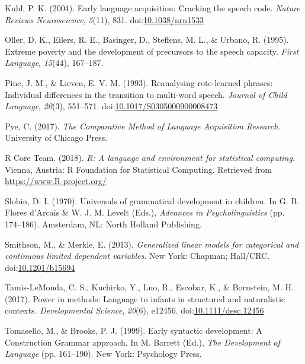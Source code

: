 \documentclass[,man,floatsintext]{apa6}
\begin{document}
\hypertarget{ref-kuhl2004early}{}
Kuhl, P. K. (2004). Early language acquisition: Cracking the speech
code. \emph{Nature Reviews Neuroscience}, \emph{5}(11), 831.
doi:\href{https://doi.org/10.1038/nrn1533}{10.1038/nrn1533}

\hypertarget{ref-oller1995extreme}{}
Oller, D. K., Eilers, R. E., Basinger, D., Steffens, M. L., \& Urbano,
R. (1995). Extreme poverty and the development of precursors to the
speech capacity. \emph{First Language}, \emph{15}(44), 167--187.

\hypertarget{ref-pine1993reanalysing}{}
Pine, J. M., \& Lieven, E. V. M. (1993). Reanalysing rote-learned
phrases: Individual differences in the transition to multi-word speech.
\emph{Journal of Child Language}, \emph{20}(3), 551--571.
doi:\href{https://doi.org/10.1017/S0305000900008473}{10.1017/S0305000900008473}

\hypertarget{ref-pye2017comparative}{}
Pye, C. (2017). \emph{The Comparative Method of Language Acquisition
Research}. University of Chicago Press.

\hypertarget{ref-R-base}{}
R Core Team. (2018). \emph{R: A language and environment for statistical
computing}. Vienna, Austria: R Foundation for Statistical Computing.
Retrieved from \url{https://www.R-project.org/}

\hypertarget{ref-slobin1970universals}{}
Slobin, D. I. (1970). Universals of grammatical development in children.
In G. B. Flores d'Arcais \& W. J. M. Levelt (Eds.), \emph{Advances in
Psycholinguistics} (pp. 174--186). Amsterdam, NL: North Holland
Publishing.

\hypertarget{ref-smithson2013generalized}{}
Smithson, M., \& Merkle, E. (2013). \emph{Generalized linear models for
categorical and continuous limited dependent variables}. New York:
Chapman; Hall/CRC.
doi:\href{https://doi.org/10.1201/b15694}{10.1201/b15694}

\hypertarget{ref-tamislemonda2017power}{}
Tamis-LeMonda, C. S., Kuchirko, Y., Luo, R., Escobar, K., \& Bornstein,
M. H. (2017). Power in methods: Language to infants in structured and
naturalistic contexts. \emph{Developmental Science}, \emph{20}(6),
e12456.
doi:\href{https://doi.org/10.1111/desc.12456}{10.1111/desc.12456}

\hypertarget{ref-tomasello1999early}{}
Tomasello, M., \& Brooks, P. J. (1999). Early syntactic development: A
Construction Grammar approach. In M. Barrett (Ed.), \emph{The
Development of Language} (pp. 161--190). New York: Psychology Press.
\end{document}
